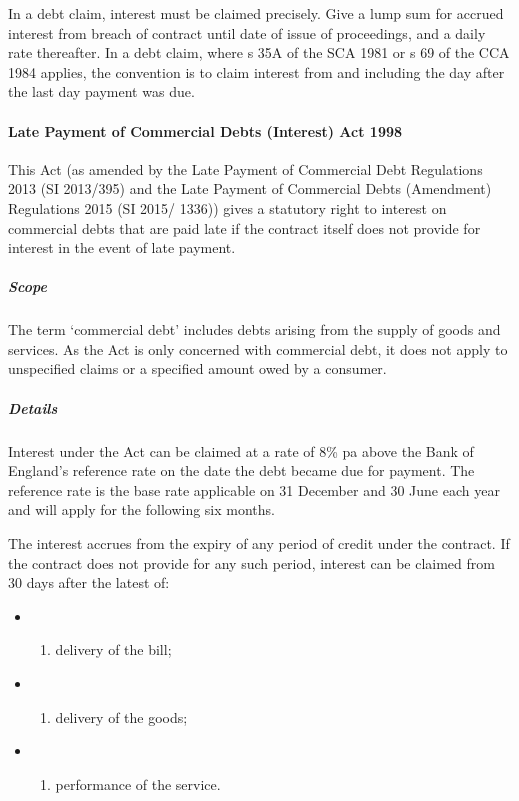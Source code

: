 \documentclass[
]{article}
\providecommand{\tightlist}{%
  \setlength{\itemsep}{0pt}\setlength{\parskip}{0pt}}
\begin{document}
In a debt claim, interest must be claimed precisely. Give a lump sum for
accrued interest from breach of contract until date of issue of
proceedings, and a daily rate thereafter. In a debt claim, where s 35A
of the SCA 1981 or s 69 of the CCA 1984 applies, the convention is to
claim interest from and including the day after the last day payment was
due.

\hypertarget{late-payment-of-commercial-debts-interest-act-1998}{%
\paragraph{Late Payment of Commercial Debts (Interest) Act
1998}\label{late-payment-of-commercial-debts-interest-act-1998}}

This Act (as amended by the Late Payment of Commercial Debt Regulations
2013 (SI 2013/395) and the Late Payment of Commercial Debts (Amendment)
Regulations 2015 (SI 2015/ 1336)) gives a statutory right to interest on
commercial debts that are paid late if the contract itself does not
provide for interest in the event of late payment.

\hypertarget{scope-1}{%
\subparagraph{Scope}\label{scope-1}}

The term `commercial debt' includes debts arising from the supply of
goods and services. As the Act is only concerned with commercial debt,
it does not apply to unspecified claims or a specified amount owed by a
consumer.

\hypertarget{details}{%
\subparagraph{Details}\label{details}}

Interest under the Act can be claimed at a rate of 8\% pa above the Bank
of England's reference rate on the date the debt became due for payment.
The reference rate is the base rate applicable on 31 December and 30
June each year and will apply for the following six months.

The interest accrues from the expiry of any period of credit under the
contract. If the contract does not provide for any such period, interest
can be claimed from 30 days after the latest of:

\begin{itemize}
\item
  \begin{enumerate}
  \def\labelenumi{(\alph{enumi})}
  \tightlist
  \item
    delivery of the bill;
  \end{enumerate}
\item
  \begin{enumerate}
  \def\labelenumi{(\alph{enumi})}
  \setcounter{enumi}{1}
  \tightlist
  \item
    delivery of the goods;
  \end{enumerate}
\item
  \begin{enumerate}
  \def\labelenumi{(\alph{enumi})}
  \setcounter{enumi}{2}
  \tightlist
  \item
    performance of the service.
  \end{enumerate}
\end{itemize}
\end{document}
